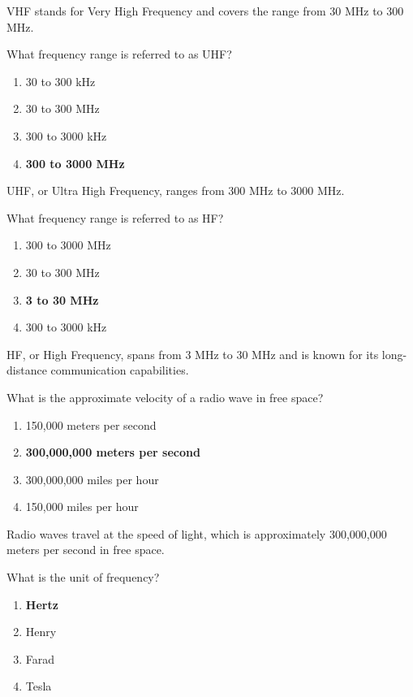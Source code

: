 VHF stands for Very High Frequency and covers the range from 30 MHz to 300 MHz.

\begin{tcolorbox}[colback=gray!10!white,colframe=black!75!black,title={T3B09}]
What frequency range is referred to as UHF?
\begin{enumerate}[label=\Alph*),noitemsep]
    \item 30 to 300 kHz
    \item 30 to 300 MHz
    \item 300 to 3000 kHz
    \item \textbf{300 to 3000 MHz}
\end{enumerate}
\end{tcolorbox}

UHF, or Ultra High Frequency, ranges from 300 MHz to 3000 MHz.

\begin{tcolorbox}[colback=gray!10!white,colframe=black!75!black,title={T3B10}]
What frequency range is referred to as HF?
\begin{enumerate}[label=\Alph*),noitemsep]
    \item 300 to 3000 MHz
    \item 30 to 300 MHz
    \item \textbf{3 to 30 MHz}
    \item 300 to 3000 kHz
\end{enumerate}
\end{tcolorbox}

HF, or High Frequency, spans from 3 MHz to 30 MHz and is known for its long-distance communication capabilities.

\begin{tcolorbox}[colback=gray!10!white,colframe=black!75!black,title={T3B11}]
What is the approximate velocity of a radio wave in free space?
\begin{enumerate}[label=\Alph*),noitemsep]
    \item 150,000 meters per second
    \item \textbf{300,000,000 meters per second}
    \item 300,000,000 miles per hour
    \item 150,000 miles per hour
\end{enumerate}
\end{tcolorbox}

Radio waves travel at the speed of light, which is approximately 300,000,000 meters per second in free space.

\begin{tcolorbox}[colback=gray!10!white,colframe=black!75!black,title={T5A06}]
What is the unit of frequency?
\begin{enumerate}[label=\Alph*),noitemsep]
    \item \textbf{Hertz}
    \item Henry
    \item Farad
    \item Tesla
\end{enumerate}
\end{tcolorbox}

